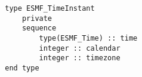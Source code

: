 \begin{verbatim}
        type ESMF_TimeInstant
            private
            sequence
                type(ESMF_Time) :: time
                integer :: calendar
                integer :: timezone
        end type
\end{verbatim}
